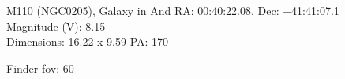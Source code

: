 \begin{block}{M110 (NGC0205), Galaxy in And}
    RA: 00:40:22.08, Dec: +41:41:07.1 \\ 
    Magnitude (V): 8.15 \\ 
    Dimensions: 16.22 x 9.59 PA: 170 

    Finder fov: 60 
\end{block}